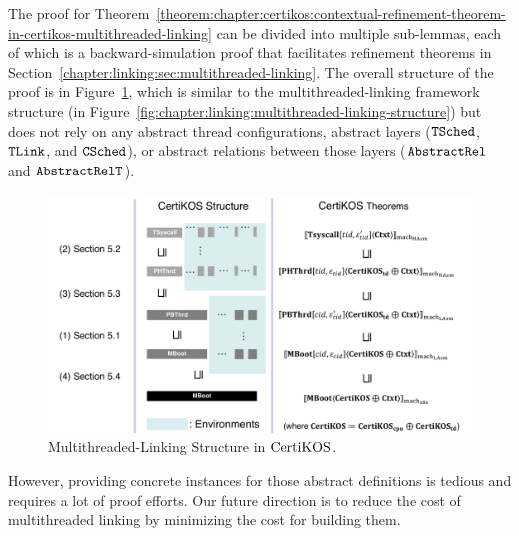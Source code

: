 The proof for Theorem~\ref{theorem:chapter:certikos:contextual-refinement-theorem-in-certikos-multithreaded-linking} 
can be divided into multiple sub-lemmas, each of which is a backward-simulation proof 
that facilitates  refinement theorems in Section~\ref{chapter:linking:sec:multithreaded-linking}. 
The overall structure of the proof is in Figure~\ref{fig:chapter:certikos:multithreaded-connect-proof-overall-structure}, which is 
similar to the multithreaded-linking framework structure (in Figure~\ref{fig:chapter:linking:multithreaded-linking-structure}) but does not rely on
any abstract thread configurations,  abstract layers (${{\mathrm{\texttt{TSched}}}}$, ${{\mathrm{\texttt{TLink}}}}$, and ${{\mathrm{\texttt{CSched}}}}$), or 
 abstract relations between those layers (${\mathrm{\texttt{AbstractRel}}}$ and ${\mathrm{\texttt{AbstractRelT}}}$).
\begin{figure}
\includegraphics[width=\textwidth, page=3]{figs/certikos/concurrent_linking}
\caption{Multithreaded-Linking Structure in $\mathrm{CertiKOS}$.}
\label{fig:chapter:certikos:multithreaded-connect-proof-overall-structure}
\end{figure}
However, providing concrete instances for those abstract definitions is tedious and requires a lot of proof efforts. 
Our future direction is to reduce the cost of multithreaded linking by minimizing the cost for building 
them.

%



